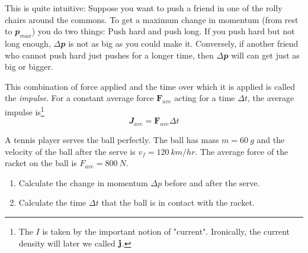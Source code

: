 This is quite intuitive: Suppose you want to push a friend in one of  the rolly chairs around the commons. To get a maximum change in momentum (from rest to $𝒑_{max}$) you do two things: Push hard and push long. If you push hard but not long enough, $Δ𝒑$ is not as big as you could make it. Conversely, if another friend who cannot push hard just pushes for a longer time, then $Δ𝒑$ will can get just as big or bigger. 

This combination of force applied and the time over which it is applied is called the {\em impulse}. For a constant average force $𝐅_{ave}$ acting for a time $Δt$, the average impulse is\footnote{The $I$ is taken by the important notion of "current". Ironically, the current density will later we called $\bf j$. }
$$
𝑱_{ave} = 𝐅_{ave} Δt
$$
\begin{exercise}
A tennis player serves the ball perfectly. The ball has mass $m= 60\ g$ and the velocity of the ball after the serve is $v_f = 120\ km/hr$. The average force of the racket on the ball is $F_{ave} = 800\ N$. 
\begin{enumerate}
\item Calculate the change in momentum $Δp$ before and after the serve.
\item Calculate the time $Δt$ that the ball is in contact with the racket.
\end{enumerate}
\end{exercise}


